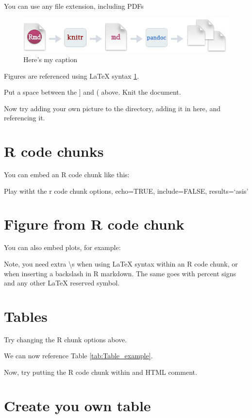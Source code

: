 \documentclass[12pt,]{article}
\begin{document}
You can use any file extension, including PDFs

\begin{figure}[htbp]
\centering
\includegraphics{RMarkdownFLow.png}
\caption{Here's my caption \label{fig:fig_example}}
\end{figure}

Figures are referenced using LaTeX syntax \ref{fig:fig_example}.

Put a space between the {]} and ( above. Knit the document.

Now try adding your own picture to the directory, adding it in here, and
referencing it.

\section{R code chunks}\label{r-code-chunks}

You can embed an R code chunk like this:

Play witht the r code chunk options, echo=TRUE, include=FALSE,
results=`asis'

\section{Figure from R code chunk}\label{figure-from-r-code-chunk}

You can also embed plots, for example:

Note, you need extra \textbackslash{}s when using LaTeX syntax within an
R code chunk, or when inserting a backslash in R markdown. The same goes
with percent signs and any other LaTeX reserved symbol.

\section{Tables}\label{tables}

Try changing the R chunk options above.

We can now reference Table \ref{tab:Table_example}.

Now, try putting the R code chunk within and HTML comment.

\section{Create you own table}\label{create-you-own-table}
\end{document}

